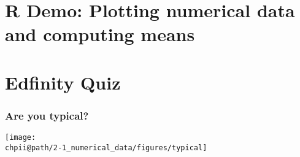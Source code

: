 \documentclass[slidestop,compress,mathserif]{beamer}
\makeatletter
\def\chpii@path{../../Chp 2}
\makeatother
\begin{document}
\section{R Demo: Plotting numerical data and computing means}

\section{Edfinity Quiz}










\begin{frame}
\frametitle{Are you typical?}

\begin{center}
\texttt{[image: \\chpii@path/2-1\_numerical\_data/figures/typical]}
\end{center}

\begin{center}
\footnotesize{}
\end{center}

\pause


\end{frame}
\end{document}
